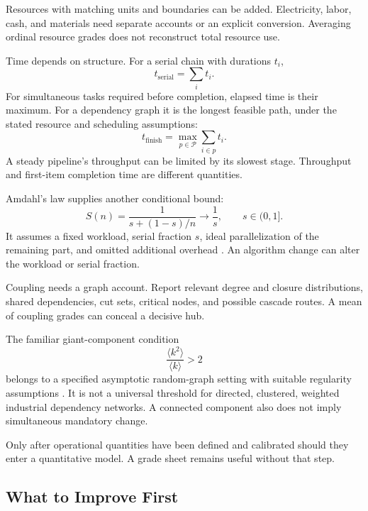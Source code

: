 Resources with matching units and boundaries can be added. Electricity, labor, cash, and materials need separate accounts or an explicit conversion. Averaging ordinal resource grades does not reconstruct total resource use.

Time depends on structure. For a serial chain with durations $t_i$,
\begin{equation}
 t_{\mathrm{serial}}=\sum_i t_i.
\end{equation}
For simultaneous tasks required before completion, elapsed time is their maximum. For a dependency graph it is the longest feasible path, under the stated resource and scheduling assumptions:
\begin{equation}
 t_{\mathrm{finish}}
 =\max_{p\in\mathcal P}\sum_{i\in p}t_i.
\end{equation}
A steady pipeline's throughput can be limited by its slowest stage. Throughput and first-item completion time are different quantities.

Amdahl's law supplies another conditional bound:
\begin{equation}
 S(n)=\frac{1}{s+(1-s)/n}\longrightarrow\frac1s,
 \qquad s\in(0,1].
\end{equation}
It assumes a fixed workload, serial fraction $s$, ideal parallelization of the remaining part, and omitted additional overhead \cite{amdahl1967validity}. An algorithm change can alter the workload or serial fraction.

Coupling needs a graph account. Report relevant degree and closure distributions, shared dependencies, cut sets, critical nodes, and possible cascade routes. A mean of coupling grades can conceal a decisive hub.

The familiar giant-component condition
\begin{equation}
 \frac{\langle k^2\rangle}{\langle k\rangle}>2
\end{equation}
belongs to a specified asymptotic random-graph setting with suitable regularity assumptions \cite{molloy1995critical}. It is not a universal threshold for directed, clustered, weighted industrial dependency networks. A connected component also does not imply simultaneous mandatory change.

Only after operational quantities have been defined and calibrated should they enter a quantitative model. A grade sheet remains useful without that step.

\subsection{What to Improve First}

